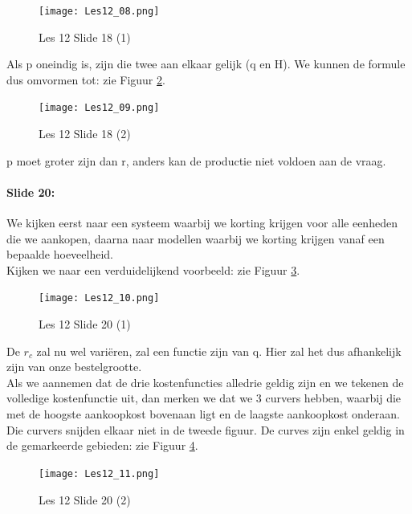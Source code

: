 \documentclass[10pt,a4paper]{report}
\begin{document}
\begin{figure}[h!]
\centering
\texttt{[image: Les12\_08.png]}
\caption{Les 12 Slide 18 (1)} 
\label{les12_08}
\end{figure}

Als p oneindig is, zijn die twee aan elkaar gelijk (q en H).
We kunnen de formule dus omvormen tot: zie Figuur \ref{les12_09}.\\

\begin{figure}[h!]
\centering
\texttt{[image: Les12\_09.png]}
\caption{Les 12 Slide 18 (2)} 
\label{les12_09}
\end{figure}

p moet groter zijn dan r, anders kan de productie niet voldoen aan de vraag.

\paragraph{Slide 20:} We kijken eerst naar een systeem waarbij we korting krijgen voor alle eenheden die we aankopen, daarna naar modellen waarbij we korting krijgen vanaf een bepaalde hoeveelheid.\\
Kijken we naar een verduidelijkend voorbeeld: zie Figuur \ref{les12_10}.

\begin{figure}[h!]
\centering
\texttt{[image: Les12\_10.png]}
\caption{Les 12 Slide 20 (1)} 
\label{les12_10}
\end{figure}

De $r_{c}$ zal nu wel vari\"eren, zal een functie zijn van q. Hier zal het dus afhankelijk zijn van onze bestelgrootte.\\
Als we aannemen dat de drie kostenfuncties alledrie geldig zijn en we tekenen de volledige kostenfunctie uit, dan merken we dat we 3 curvers hebben, waarbij die met de hoogste aankoopkost bovenaan ligt en de laagste aankoopkost onderaan. Die curvers snijden elkaar niet in de tweede figuur. De curves zijn enkel geldig in de gemarkeerde gebieden: zie Figuur \ref{les12_11}.\\

\begin{figure}[h!]
\centering
\texttt{[image: Les12\_11.png]}
\caption{Les 12 Slide 20 (2)} 
\label{les12_11}
\end{figure}
\end{document}
